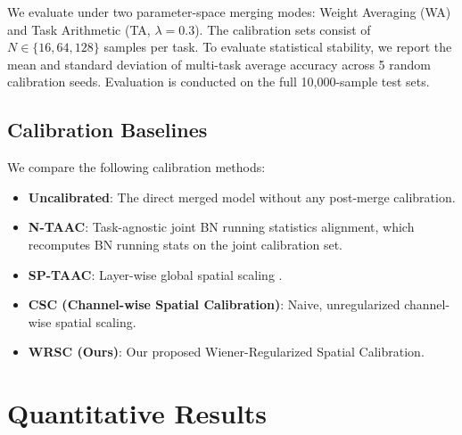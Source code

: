 \documentclass{article}
\theoremstyle{plain}
\theoremstyle{definition}
\theoremstyle{remark}
\begin{document}
We evaluate under two parameter-space merging modes: Weight Averaging (WA) and Task Arithmetic (TA, $\lambda = 0.3$). The calibration sets consist of $N \in \{16, 64, 128\}$ samples per task. To evaluate statistical stability, we report the mean and standard deviation of multi-task average accuracy across 5 random calibration seeds. Evaluation is conducted on the full 10,000-sample test sets.

\subsection{Calibration Baselines}
We compare the following calibration methods:
\begin{itemize}
    \item \textbf{Uncalibrated}: The direct merged model without any post-merge calibration.
    \item \textbf{N-TAAC}: Task-agnostic joint BN running statistics alignment, which recomputes BN running stats on the joint calibration set.
    \item \textbf{SP-TAAC}: Layer-wise global spatial scaling \citep{Anonymous2026}.
    \item \textbf{CSC (Channel-wise Spatial Calibration)}: Naive, unregularized channel-wise spatial scaling.
    \item \textbf{WRSC (Ours)}: Our proposed Wiener-Regularized Spatial Calibration.
\end{itemize}

\section{Quantitative Results}
\label{sec:results}
\end{document}
